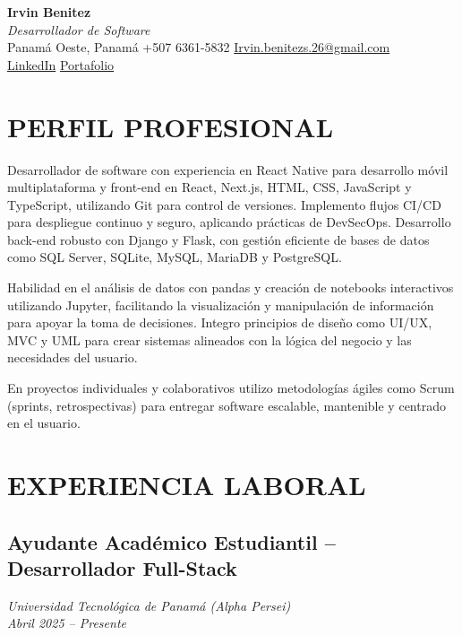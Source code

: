 \documentclass[11pt,a4paper]{article}
\begin{document}
\begin{center}
{\LARGE \textbf{Irvin Benitez}} \\[4pt]
\textit{Desarrollador de Software} \\[6pt]

Panamá Oeste, Panamá \hfill
+507 6361-5832 \hfill
\href{mailto:Irvin.benitezs.26@gmail.com}{Irvin.benitezs.26@gmail.com} \\
\href{https://www.linkedin.com/in/irvin-benitez-11313231b/}{LinkedIn} \hfill
\href{https://irvin-benitez.software}{Portafolio} \\
\end{center}



\vspace{-8pt}

\section*{PERFIL PROFESIONAL}
Desarrollador de software con experiencia en React Native para desarrollo móvil multiplataforma y front-end en React, Next.js, HTML, CSS, JavaScript y TypeScript, utilizando Git para control de versiones. Implemento flujos CI/CD para despliegue continuo y seguro, aplicando prácticas de DevSecOps. Desarrollo back-end robusto con Django y Flask, con gestión eficiente de bases de datos como SQL Server, SQLite, MySQL, MariaDB y PostgreSQL.

Habilidad en el análisis de datos con pandas y creación de notebooks interactivos utilizando Jupyter, facilitando la visualización y manipulación de información para apoyar la toma de decisiones. Integro principios de diseño como UI/UX, MVC y UML para crear sistemas alineados con la lógica del negocio y las necesidades del usuario.

En proyectos individuales y colaborativos utilizo metodologías ágiles como Scrum (sprints, retrospectivas) para entregar software escalable, mantenible y centrado en el usuario.

\section*{EXPERIENCIA LABORAL}

\subsection*{Ayudante Académico Estudiantil -- Desarrollador Full-Stack}
\textit{Universidad Tecnológica de Panamá (Alpha Persei)}\\
\textit{Abril 2025 -- Presente}
\end{document}
